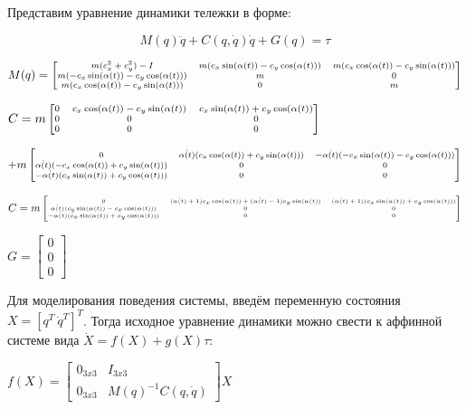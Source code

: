 \documentclass[fleqn, a4paper, 12pt, russian]{article}
\begin{document}
Представим уравнение динамики тележки в форме:

\begin{equation}
	M(q)\ddot{q}+C(q,\dot{q})\dot{q}+G(q)=\tau
\end{equation}


$\scriptsize{M(q)=\begin{bmatrix} 
	m(c_x^2+c_y^2)-I& m(c_x\sin(\alpha(t))-c_y\cos(\alpha(t)))&m(c_x\cos(\alpha(t))-c_y\sin(\alpha(t)))\\
	m(-c_x\sin(\alpha(t))-c_y\cos(\alpha(t)))&m&0\\
	m(c_x\cos(\alpha(t))-c_y\sin(\alpha(t)))&0&m\\
\end{bmatrix}}$

$\scriptsize{C=m\begin{bmatrix}
	0&c_x\cos(\alpha(t))-c_y\sin(\alpha(t))&c_x\sin(\alpha(t))+c_y\cos(\alpha(t))\\	
	0&0&0\\
	0&0&0
\end{bmatrix}}$

$\scriptsize{+m\begin{bmatrix}
		0&\dot{\alpha(t)}(c_x\cos(\alpha(t))+c_y\sin(\alpha(t)))&-\dot{\alpha(t)}(-c_x\sin(\alpha(t))-c_y\cos(\alpha(t)))\\	
		\dot{\alpha(t)}(-c_x\cos(\alpha(t))+c_y\sin(\alpha(t)))&0&0\\
		-\dot{\alpha(t)}(c_x\sin(\alpha(t))+c_y\cos(\alpha(t)))&0&0
\end{bmatrix}}$


$\tiny{C=m\begin{bmatrix}
	0&(\dot{\alpha(t)}+1)c_x\cos(\alpha(t))+(\dot{\alpha(t)}-1)c_y\sin(\alpha(t))&
	(\dot{\alpha(t)}+1)(c_x\sin(\alpha(t))+c_y\cos(\alpha(t)))\\
	\dot{\alpha(t)}(c_y\sin(\alpha(t))-c_x\cos(\alpha(t)))&0&0\\
	-\dot{\alpha(t)}(c_x\sin(\alpha(t))+c_y\cos(\alpha(t)))&0&0
\end{bmatrix}}$

$G=\begin{bmatrix} 0\\ 0\\ 0 \end{bmatrix}$

Для моделирования поведения системы, введём переменную состояния $X=[q^T~\dot{q}^T]^T$.
Тогда исходное уравнение динамики можно свести к аффинной системе вида $\dot{X}=f(X)+g(X)\tau$:

$f(X) = \begin{bmatrix}
	0_{3x3} &I_{3x3}\\
	0_{3x3} & M(q)^{-1}C(q,\dot{q})
\end{bmatrix}X$
\end{document}

